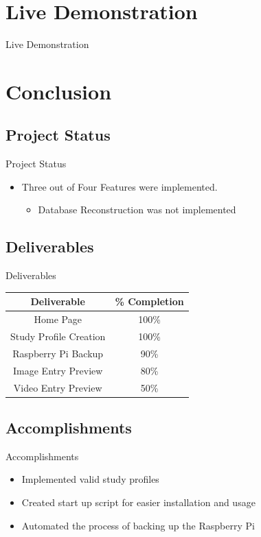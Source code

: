 \documentclass[17pt, aspectratio=169]{beamer}
\begin{document}
\section*{Live Demonstration}
\begin{frame}
	\begin{huge}
		\begin{center}
			Live Demonstration
		\end{center}
	\end{huge}
\end{frame}
\section{Conclusion}
\subsection*{Project Status}
\begin{frame}{Project Status}
	\begin{itemize}
		\item Three out of Four Features were implemented.
		      \begin{itemize}
			      \item Database Reconstruction was not implemented
		      \end{itemize}
	\end{itemize}
\end{frame}
\subsection{Deliverables}
\begin{frame}{Deliverables}
	\begin{center}
		\begin{tabular}{||c | c||}
			\hline
			Deliverable            & \% Completion \\
			\hline
			Home Page              & 100\%         \\
			\hline
			Study Profile Creation & 100\%          \\
			\hline
			Raspberry Pi Backup    & 90\%          \\
			\hline
			Image Entry Preview    & 80\%          \\
			\hline
			Video Entry Preview    & 50\%          \\
			\hline
		\end{tabular}
	\end{center}
\end{frame}
\subsection{Accomplishments}
\begin{frame}{Accomplishments}
	\begin{itemize}
		\item Implemented valid study profiles
		\item Created start up script for easier installation and usage
		\item Automated the process of backing up the Raspberry Pi
	\end{itemize}
\end{frame}
\end{document}
